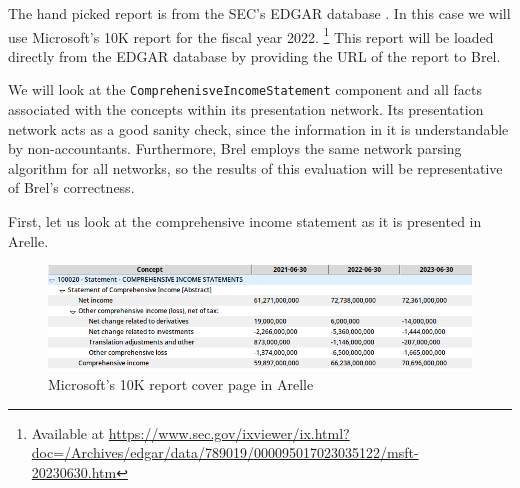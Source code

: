 
The hand picked report is from the SEC's EDGAR database \cite{sec_edgar}.
In this case we will use Microsoft's 10K report for the fiscal year 2022.
\footnote{Available at \url{https://www.sec.gov/ixviewer/ix.html?doc=/Archives/edgar/data/789019/000095017023035122/msft-20230630.htm}}
This report will be loaded directly from the EDGAR database by providing the URL of the report to Brel.

We will look at the \texttt{ComprehenisveIncomeStatement} component and all facts associated with the concepts within its presentation network.
Its presentation network acts as a good sanity check, since the information in it is understandable by non-accountants.
Furthermore, Brel employs the same network parsing algorithm for all networks, so the results of this evaluation will be representative of Brel's correctness.

First, let us look at the comprehensive income statement as it is presented in Arelle.

\begin{figure}[H]
  \centering
    \includegraphics[width=1\textwidth]{images/msft_income_statement_arelle.png}
    \caption{Microsoft's 10K report cover page in Arelle}
    \label{fig:msft_income_statement_arelle}
\end{figure}

